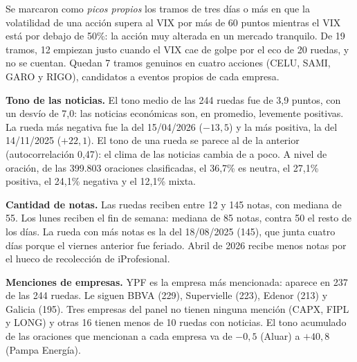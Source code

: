 Se marcaron como \textit{picos propios} los tramos de tres días o más en que la volatilidad
de una acción supera al VIX por más de 60 puntos mientras el VIX está por debajo de 50\%: la
acción muy alterada en un mercado tranquilo. De 19 tramos, 12 empiezan justo cuando el VIX cae
de golpe por el eco de 20 ruedas, y no se cuentan. Quedan 7 tramos genuinos en cuatro acciones
(CELU, SAMI, GARO y RIGO), candidatos a eventos propios de cada empresa.

\textbf{Tono de las noticias.} El tono medio de las 244 ruedas fue de 3,9 puntos, con un
desvío de 7,0: las noticias económicas son, en promedio, levemente positivas. La rueda más
negativa fue la del 15/04/2026 ($-13{,}5$) y la más positiva, la del 14/11/2025 ($+22{,}1$).
El tono de una rueda se parece al de la anterior (autocorrelación 0,47): el clima de las
noticias cambia de a poco. A nivel de oración, de las 399.803 oraciones clasificadas, el 36,7\%
es neutra, el 27,1\% positiva, el 24,1\% negativa y el 12,1\% mixta.

\textbf{Cantidad de notas.} Las ruedas reciben entre 12 y 145 notas, con mediana de 55. Los
lunes reciben el fin de semana: mediana de 85 notas, contra 50 el resto de los días. La rueda
con más notas es la del 18/08/2025 (145), que junta cuatro días porque el viernes anterior fue
feriado. Abril de 2026 recibe menos notas por el hueco de recolección de iProfesional.

\textbf{Menciones de empresas.} YPF es la empresa más mencionada: aparece en 237 de las 244
ruedas. Le siguen BBVA (229), Supervielle (223), Edenor (213) y Galicia (195). Tres empresas
del panel no tienen ninguna mención (CAPX, FIPL y LONG) y otras 16 tienen menos de 10 ruedas
con noticias. El tono acumulado de las oraciones que mencionan a cada empresa va de $-0{,}5$
(Aluar) a $+40{,}8$ (Pampa Energía).


